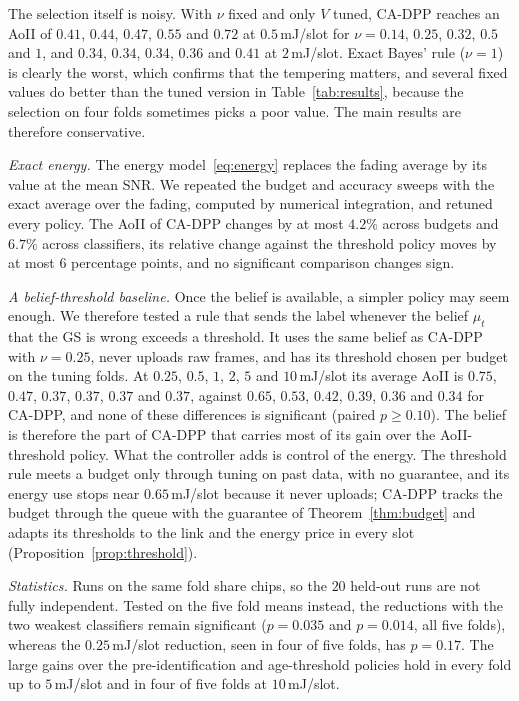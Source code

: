 \documentclass[5p,twocolumn]{elsarticle}
\theoremstyle{remark}
\begin{document}
The selection itself is noisy. With $\nu$ fixed and only $V$ tuned, CA-DPP reaches an AoII of $0.41$, $0.44$, $0.47$, $0.55$ and $0.72$ at $0.5$\,mJ/slot for $\nu=0.14$, $0.25$, $0.32$, $0.5$ and $1$, and $0.34$, $0.34$, $0.34$, $0.36$ and $0.41$ at $2$\,mJ/slot. Exact Bayes' rule ($\nu=1$) is clearly the worst, which confirms that the tempering matters, and several fixed values do better than the tuned version in Table~\ref{tab:results}, because the selection on four folds sometimes picks a poor value. The main results are therefore conservative.

\emph{Exact energy.} The energy model~\eqref{eq:energy} replaces the fading average by its value at the mean SNR. We repeated the budget and accuracy sweeps with the exact average over the fading, computed by numerical integration, and retuned every policy. The AoII of CA-DPP changes by at most $4.2\%$ across budgets and $6.7\%$ across classifiers, its relative change against the threshold policy moves by at most $6$ percentage points, and no significant comparison changes sign.

\emph{A belief-threshold baseline.} Once the belief is available, a simpler policy may seem enough. We therefore tested a rule that sends the label whenever the belief $\mu_t$ that the GS is wrong exceeds a threshold. It uses the same belief as CA-DPP with $\nu=0.25$, never uploads raw frames, and has its threshold chosen per budget on the tuning folds. At $0.25$, $0.5$, $1$, $2$, $5$ and $10$\,mJ/slot its average AoII is $0.75$, $0.47$, $0.37$, $0.37$, $0.37$ and $0.37$, against $0.65$, $0.53$, $0.42$, $0.39$, $0.36$ and $0.34$ for CA-DPP, and none of these differences is significant (paired $p\ge0.10$). The belief is therefore the part of CA-DPP that carries most of its gain over the AoII-threshold policy. What the controller adds is control of the energy. The threshold rule meets a budget only through tuning on past data, with no guarantee, and its energy use stops near $0.65$\,mJ/slot because it never uploads; CA-DPP tracks the budget through the queue with the guarantee of Theorem~\ref{thm:budget} and adapts its thresholds to the link and the energy price in every slot (Proposition~\ref{prop:threshold}).

\emph{Statistics.} Runs on the same fold share chips, so the $20$ held-out runs are not fully independent. Tested on the five fold means instead, the reductions with the two weakest classifiers remain significant ($p=0.035$ and $p=0.014$, all five folds), whereas the $0.25$\,mJ/slot reduction, seen in four of five folds, has $p=0.17$. The large gains over the pre-identification and age-threshold policies hold in every fold up to $5$\,mJ/slot and in four of five folds at $10$\,mJ/slot.
\end{document}
